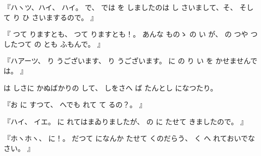 %
『ハヽツ、ハイ、
%
ハイ。
%
で、
%
では
を
しましたのは
し
さいまして、そ、
%
そして
り
ひ
さいまするので。
』

%
『
つて
りますとも、
%
つて
りますとも！。
%
あんな
ものゝ
の
い
が、
%
の
つや
つ
したつて
の
とも
ふもんで。
』

%
『ハアーツ、
%
り
うございます、
%
り
うございます。
%
に
の
り
い
を
かせませんでは。
』

%
は
しさに
かぬばかりの
して、
%
しをさへ
ば
たんとし
になつたり。

%
『お
に
すつて、
%
へでも
れて
て
るの？。
』

%
『ハイ、
%
イエ。
%
に
れてはまゐりましたが、
%
の
に
たせて
きましたので。
』

%
『ホヽホヽ、
%
に！。%
%
だつて
になんか
たせて
くのだらう、
%
く
へ
れておいでなさい。
』
